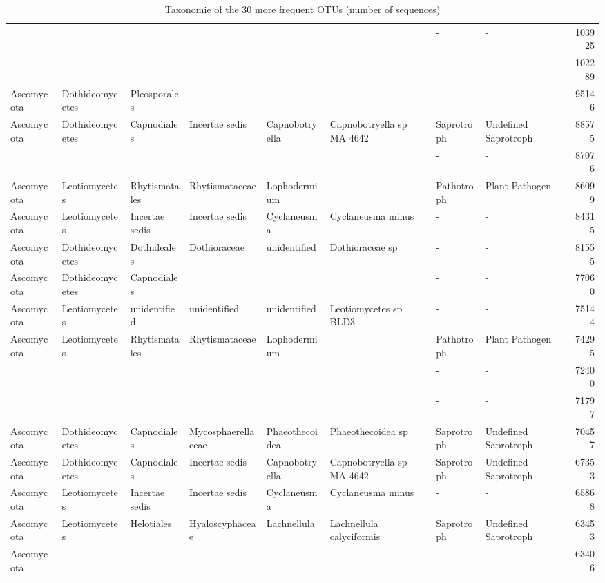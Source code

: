 \documentclass[12pt]{article}\usepackage[]{graphicx}\usepackage[]{color}
\numberwithin{figure}{section}
\begin{document}
\begin{landscape}
\begin{table}[ht]
\begin{tabular}{llllllllr}
   &  &  &  &  &  & - & - & 103925 \\ 
   &  &  &  &  &  & - & - & 102289 \\ 
  Ascomycota & Dothideomycetes & Pleosporales &  &  &  & - & - & 95146 \\ 
  Ascomycota & Dothideomycetes & Capnodiales & Incertae sedis & Capnobotryella & Capnobotryella sp MA 4642 & Saprotroph & Undefined Saprotroph & 88575 \\ 
   &  &  &  &  &  & - & - & 87076 \\ 
  Ascomycota & Leotiomycetes & Rhytismatales & Rhytismataceae & Lophodermium &  & Pathotroph & Plant Pathogen & 86099 \\ 
  Ascomycota & Leotiomycetes & Incertae sedis & Incertae sedis & Cyclaneusma & Cyclaneusma minus & - & - & 84315 \\ 
  Ascomycota & Dothideomycetes & Dothideales & Dothioraceae & unidentified & Dothioraceae sp & - & - & 81555 \\ 
  Ascomycota & Dothideomycetes & Capnodiales &  &  &  & - & - & 77060 \\ 
  Ascomycota & Leotiomycetes & unidentified & unidentified & unidentified & Leotiomycetes sp BLD3 & - & - & 75144 \\ 
  Ascomycota & Leotiomycetes & Rhytismatales & Rhytismataceae & Lophodermium &  & Pathotroph & Plant Pathogen & 74295 \\ 
   &  &  &  &  &  & - & - & 72400 \\ 
   &  &  &  &  &  & - & - & 71797 \\ 
  Ascomycota & Dothideomycetes & Capnodiales & Mycosphaerellaceae & Phaeothecoidea & Phaeothecoidea sp & Saprotroph & Undefined Saprotroph & 70457 \\ 
  Ascomycota & Dothideomycetes & Capnodiales & Incertae sedis & Capnobotryella & Capnobotryella sp MA 4642 & Saprotroph & Undefined Saprotroph & 67353 \\ 
  Ascomycota & Leotiomycetes & Incertae sedis & Incertae sedis & Cyclaneusma & Cyclaneusma minus & - & - & 65868 \\ 
  Ascomycota & Leotiomycetes & Helotiales & Hyaloscyphaceae & Lachnellula & Lachnellula calyciformis & Saprotroph & Undefined Saprotroph & 63453 \\ 
  Ascomycota &  &  &  &  &  & - & - & 63406 \\ 
   \hline
\end{tabular}
\endgroup
\caption{Taxonomie of the 30 more
             frequent OTUs (number of sequences)} 
\end{table}

\end{landscape}
\end{document}
